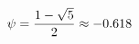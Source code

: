 \documentclass[preview]{standalone}
\begin{document}
\begin{align*}
\special{dvisvgm:raw <g id='unique000'>}\psi = \frac{1 - \sqrt{5}}{2} \approx -0.618\special{dvisvgm:raw </g>}
\end{align*}
\end{document}
